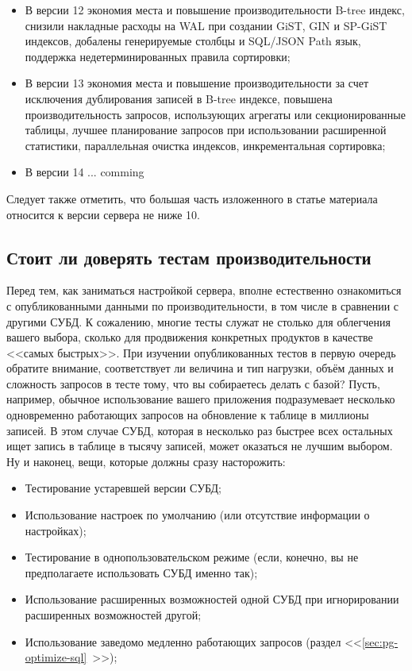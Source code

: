 \begin{itemize}
  \item В версии 12 экономия места и повышение производительности B-tree индекс, снизили накладные расходы на WAL при создании GiST, GIN и SP-GiST индексов, добалены генерируемые столбцы и SQL/JSON Path язык, поддержка недетерминированных правила сортировки;
  \item В версии 13 экономия места и повышение производительности за счет исключения дублирования записей в B-tree индексе, повышена производительность запросов, использующих агрегаты или секционированные таблицы, лучшее планирование запросов при использовании расширенной статистики, параллельная очистка индексов, инкрементальная сортировка;
  \item В версии 14 ... comming
\end{itemize}

Следует также отметить, что большая часть изложенного в статье материала относится к версии сервера не ниже 10.


\subsection{Стоит ли доверять тестам производительности}

Перед тем, как заниматься настройкой сервера, вполне естественно ознакомиться с опубликованными данными по производительности, в том числе в сравнении с другими СУБД. К сожалению, многие тесты служат не столько для облегчения вашего выбора, сколько для продвижения конкретных продуктов в качестве <<самых быстрых>>. При изучении опубликованных тестов в первую очередь обратите внимание, соответствует ли величина и тип нагрузки, объём данных и сложность запросов в тесте тому, что вы собираетесь делать с базой? Пусть, например, обычное использование вашего приложения подразумевает несколько одновременно работающих запросов на обновление к таблице в миллионы записей. В этом случае СУБД, которая в несколько раз быстрее всех остальных ищет запись в таблице в тысячу записей, может оказаться не лучшим выбором. Ну и наконец, вещи, которые должны сразу насторожить:

\begin{itemize}
  \item Тестирование устаревшей версии СУБД;
  \item Использование настроек по умолчанию (или отсутствие информации о настройках);
  \item Тестирование в однопользовательском режиме (если, конечно, вы не предполагаете использовать СУБД именно так);
  \item Использование расширенных возможностей одной СУБД при игнорировании расширенных возможностей другой;
  \item Использование заведомо медленно работающих запросов (раздел <<\ref{sec:pg-optimize-sql}~>>);
\end{itemize}

